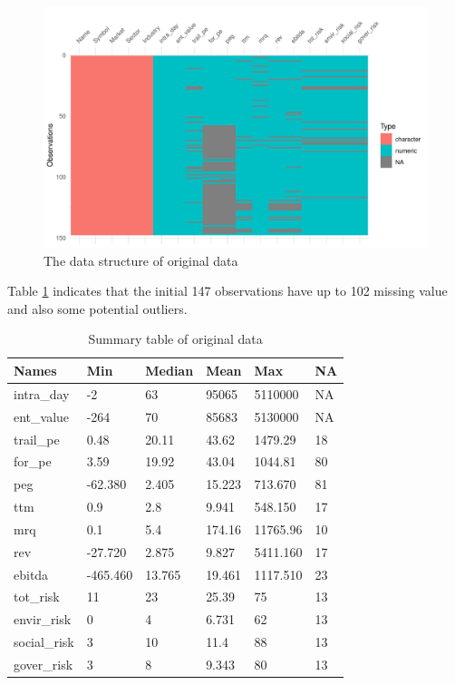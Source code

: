 \documentclass[11pt,a4paper,]{article}
\begin{document}
\begin{figure}
\centering
\includegraphics{ass2_files/figure-latex/vis-data-1.pdf}
\caption{\label{fig:vis-data}The data structure of original data}
\end{figure}

Table \ref{tab:summary-table} indicates that the initial 147 observations have up to 102 missing value and also some potential outliers.

\begin{table}

\caption{\label{tab:summary-table}Summary table of original data}
\centering
\begin{tabular}[t]{l|l|l|l|l|l}
\hline
Names & Min & Median & Mean & Max & NA\\
\hline
intra\_day & -2 & 63 & 95065 & 5110000 & NA\\
\hline
ent\_value & -264 & 70 & 85683 & 5130000 & NA\\
\hline
trail\_pe & 0.48 & 20.11 & 43.62 & 1479.29 & 18\\
\hline
for\_pe & 3.59 & 19.92 & 43.04 & 1044.81 & 80\\
\hline
peg & -62.380 & 2.405 & 15.223 & 713.670 & 81\\
\hline
ttm & 0.9 & 2.8 & 9.941 & 548.150 & 17\\
\hline
mrq & 0.1 & 5.4 & 174.16 & 11765.96 & 10\\
\hline
rev & -27.720 & 2.875 & 9.827 & 5411.160 & 17\\
\hline
ebitda & -465.460 & 13.765 & 19.461 & 1117.510 & 23\\
\hline
tot\_risk & 11 & 23 & 25.39 & 75 & 13\\
\hline
envir\_risk & 0 & 4 & 6.731 & 62 & 13\\
\hline
social\_risk & 3 & 10 & 11.4 & 88 & 13\\
\hline
gover\_risk & 3 & 8 & 9.343 & 80 & 13\\
\hline
\end{tabular}
\end{table}
\end{document}
